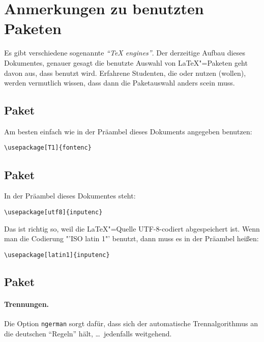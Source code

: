 \section{Anmerkungen zu benutzten Paketen}
\label{sec:benutzte-pakete}

Es gibt verschiedene sogenannte \emph{"`\TeX{} engines"'}.
%
Der derzeitige Aufbau dieses Dokumentes, genauer gesagt die benutzte Auswahl
von \LaTeX"=Paketen geht davon aus, dass  benutzt wird.
%
Erfahrene Studenten, die  oder  nutzen
(wollen), werden vermutlich wissen, dass dann die Paketauswahl anders scein
muss.

\subsection{Paket }

Am besten einfach wie in der Präambel dieses Dokuments angegeben benutzen:

\verb|\usepackage[T1]{fontenc}|

\subsection{Paket }

In der Präambel dieses Dokumentes steht:

\verb|\usepackage[utf8]{inputenc}|

Das ist richtig so, weil die \LaTeX"=Quelle UTF-8-codiert abgespeichert
ist. Wenn man die Codierung "'ISO latin 1"' benutzt, dann muss es in der
Präambel heißen:

\verb|\usepackage[latin1]{inputenc}|

\subsection{Paket }

\paragraph{Trennungen.}

Die Option \verb|ngerman| sorgt dafür, dass sich der automatische
Trennalgorithmus an die deutschen "`Regeln"' hält, \dots\ jedenfalls weitgehend.

